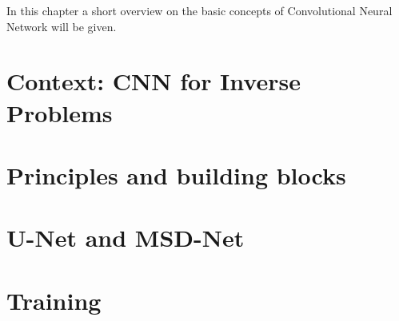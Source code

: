 In this chapter a short overview on the basic concepts of Convolutional Neural Network will be given. 

\section{Context: CNN for Inverse Problems}
\section{Principles and building blocks}\label{chp:cnn}
\section{U-Net and MSD-Net}
\section{Training}

